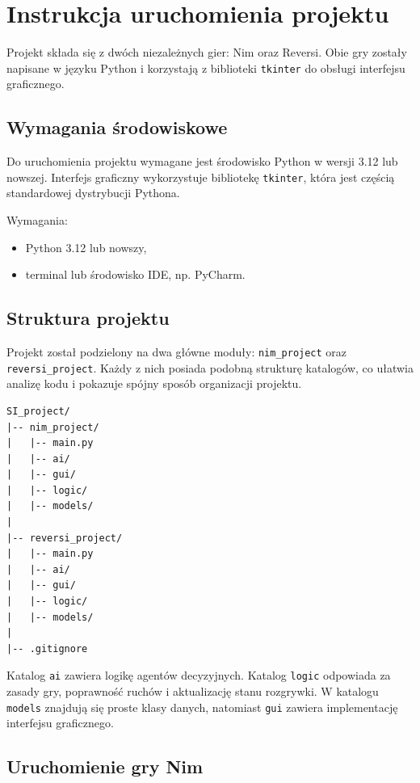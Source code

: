 \chapter{Instrukcja uruchomienia projektu}

Projekt składa się z dwóch niezależnych gier: Nim oraz Reversi. Obie gry zostały napisane w języku Python i korzystają z biblioteki \texttt{tkinter} do obsługi interfejsu graficznego.

\section{Wymagania środowiskowe}

Do uruchomienia projektu wymagane jest środowisko Python w wersji 3.12 lub nowszej. Interfejs graficzny wykorzystuje bibliotekę \texttt{tkinter}, która jest częścią standardowej dystrybucji Pythona.

Wymagania:
\begin{itemize}
\item Python 3.12 lub nowszy,
\item terminal lub środowisko IDE, np. PyCharm.
\end{itemize}

\section{Struktura projektu}

Projekt został podzielony na dwa główne moduły: \texttt{nim\_project} oraz \texttt{reversi\_project}. Każdy z nich posiada podobną strukturę katalogów, co ułatwia analizę kodu i pokazuje spójny sposób organizacji projektu.

\begin{lstlisting}[caption={Uproszczona struktura projektu.}, label={lst:project-structure}]
SI_project/
|-- nim_project/
|   |-- main.py
|   |-- ai/
|   |-- gui/
|   |-- logic/
|   |-- models/
|
|-- reversi_project/
|   |-- main.py
|   |-- ai/
|   |-- gui/
|   |-- logic/
|   |-- models/
|
|-- .gitignore
\end{lstlisting}

Katalog \texttt{ai} zawiera logikę agentów decyzyjnych. Katalog \texttt{logic} odpowiada za zasady gry, poprawność ruchów i aktualizację stanu rozgrywki. W katalogu \texttt{models} znajdują się proste klasy danych, natomiast \texttt{gui} zawiera implementację interfejsu graficznego.

\newpage

\section{Uruchomienie gry Nim}

